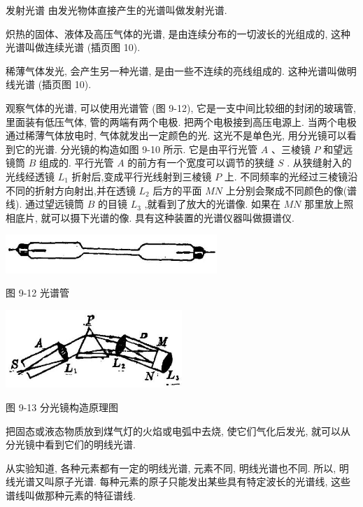 \documentclass[10pt]{article}
\begin{document}
发射光谱 由发光物体直接产生的光谱叫做发射光谱.

炽热的固体、液体及高压气体的光谱, 是由连续分布的一切波长的光组成的, 这种光谱叫做连续光谱 (插页图 10).

稀薄气体发光, 会产生另一种光谱, 是由一些不连续的亮线组成的. 这种光谱叫做明线光谱 (插页图 10).

观察气体的光谱, 可以使用光谱管 (图 9-12), 它是一支中间比较细的封闭的玻璃管, 里面装有低压气体, 管的两端有两个电极. 把两个电极接到高压电源上. 当两个电极通过稀薄气体放电时, 气体就发出一定颜色的光. 这光不是单色光, 用分光镜可以看到它的光谱. 分光镜的构造如图 9-10 所示. 它是由平行光管 \(A\) 、三棱镜 \(P\) 和望远镜筒 \(B\) 组成的. 平行光管 \(A\) 的前方有一个宽度可以调节的狭缝 \(S\) . 从狭缝射入的光线经透镜 \({L}_{1}\) 折射后,变成平行光线射到三棱镜 \(P\) 上. 不同频率的光经过三棱镜沿不同的折射方向射出,并在透镜 \({L}_{2}\) 后方的平面 \({MN}\) 上分别会聚成不同颜色的像(谱线). 通过望远镜筒 \(B\) 的目镜 \({L}_{3}\) ,就看到了放大的光谱像. 如果在 \({MN}\) 那里放上照相底片, 就可以摄下光谱的像. 具有这种装置的光谱仪器叫做摄谱仪.

\begin{center}
\includegraphics[max width=0.6\textwidth]{images/01913056-1f15-74d8-9184-9aab52c9d66b_313_154444.jpg}
\end{center}

图 9-12 光谱管

\begin{center}
\includegraphics[max width=0.5\textwidth]{images/01913056-1f15-74d8-9184-9aab52c9d66b_313_241794.jpg}
\end{center}

图 9-13 分光镜构造原理图

把固态或液态物质放到煤气灯的火焰或电弧中去烧, 使它们气化后发光, 就可以从分光镜中看到它们的明线光谱.

从实验知道, 各种元素都有一定的明线光谱, 元素不同, 明线光谱也不同. 所以, 明线光谱又叫原子光谱. 每种元素的原子只能发出某些具有特定波长的光谱线, 这些谱线叫做那种元素的特征谱线.
\end{document}
